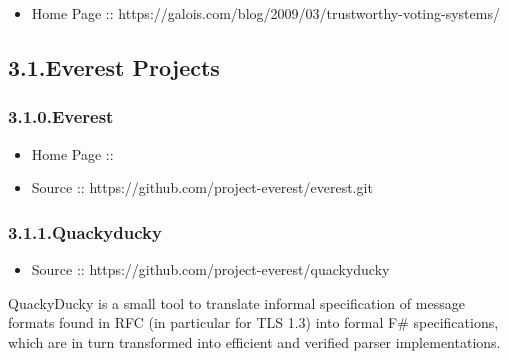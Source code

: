 \documentclass[12pt,twoside]{article}
\begin{document}
\begin{itemize}[noitemsep,topsep=\mdcompacttopsep]%

\item{}Home Page :: https://galois.com/blog/2009/03/trustworthy-voting-systems/%
\end{itemize}%

\subsection{3.1.\hspace*{0.5em}Everest Projects}\label{sec-everest-projects}%

\subsubsection{3.1.0.\hspace*{0.5em}Everest}\label{sec-everest}%

\begin{itemize}[noitemsep,topsep=\mdcompacttopsep]%

\item{}Home Page ::%

\item{}Source :: https://github.com/project-everest/everest.git%
\end{itemize}%

\subsubsection{3.1.1.\hspace*{0.5em}Quackyducky}\label{sec-quackyducky}%

\begin{itemize}[noitemsep,topsep=\mdcompacttopsep]%

\item{}Source :: https://github.com/project-everest/quackyducky%
\end{itemize}%

\noindent{}QuackyDucky is a small tool to translate informal specification of
message formats found in RFC (in particular for TLS 1.3) into formal
F\# specifications, which are in turn transformed into efficient and
verified parser implementations.%
\end{document}
